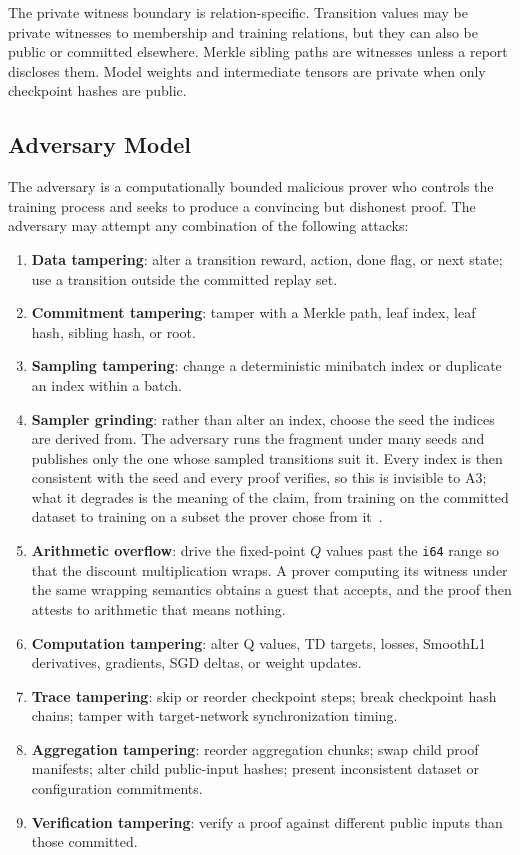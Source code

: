 The private witness boundary is relation-specific. Transition values may be
private witnesses to membership and training relations, but they can also be
public or committed elsewhere. Merkle sibling paths are witnesses unless a
report discloses them. Model weights and intermediate tensors are private when
only checkpoint hashes are public.

\subsection{Adversary Model}\label{subsec:adversary}

The adversary is a computationally bounded malicious prover who controls the
training process and seeks to produce a convincing but dishonest proof. The
adversary may attempt any combination of the following attacks:

\begin{enumerate}[leftmargin=1.8em, label=\textbf{A\arabic*}.]
  \item \textbf{Data tampering}: alter a transition reward, action, done flag,
  or next state; use a transition outside the committed replay set.
  \item \textbf{Commitment tampering}: tamper with a Merkle path, leaf index,
  leaf hash, sibling hash, or root.
  \item \textbf{Sampling tampering}: change a deterministic minibatch index or
  duplicate an index within a batch.
  \item \textbf{Sampler grinding}: rather than alter an index, choose the seed
  the indices are derived from. The adversary runs the fragment under many
  seeds and publishes only the one whose sampled transitions suit it. Every
  index is then consistent with the seed and every proof verifies, so this is
  invisible to A3; what it degrades is the meaning of the claim, from training
  on the committed dataset to training on a subset the prover chose from
  it~\cite{zkpotvicinity2025}.
  \item \textbf{Arithmetic overflow}: drive the fixed-point $Q$ values past the
  \texttt{i64} range so that the discount multiplication wraps. A prover
  computing its witness under the same wrapping semantics obtains a guest that
  accepts, and the proof then attests to arithmetic that means nothing.
  \item \textbf{Computation tampering}: alter Q values, TD targets, losses,
  SmoothL1 derivatives, gradients, SGD deltas, or weight updates.
  \item \textbf{Trace tampering}: skip or reorder checkpoint steps; break
  checkpoint hash chains; tamper with target-network synchronization timing.
  \item \textbf{Aggregation tampering}: reorder aggregation chunks; swap child
  proof manifests; alter child public-input hashes; present inconsistent
  dataset or configuration commitments.
  \item \textbf{Verification tampering}: verify a proof against different
  public inputs than those committed.
\end{enumerate}

